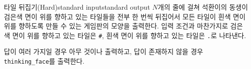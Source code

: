 \begin{problem}{타일 뒤집기(Hard)}{standard input}{standard output}
\OutputFile
$N$개의 줄에 걸쳐 석환이의 동생이 검은색 면이 위를 향하고 있는 타일들을 전부 한 번씩 뒤집어서 모든 타일이 흰색 면이 위를 향하도록 만들 수 있는 게임판의 모양을 출력한다. 입력 조건과 마찬가지로 검은색 면이 위를 향하고 있는 타일은 \texttt{\#}, 흰색 면이 위를 향하고 있는 타일은 \texttt{.}로 나타낸다.

답이 여러 가지일 경우 아무 것이나 출력하고, 답이 존재하지 않을 경우 \texttt{thinking\_face}를 출력한다.

\Example

\begin{example}
%
%
\end{example}

\end{problem}
